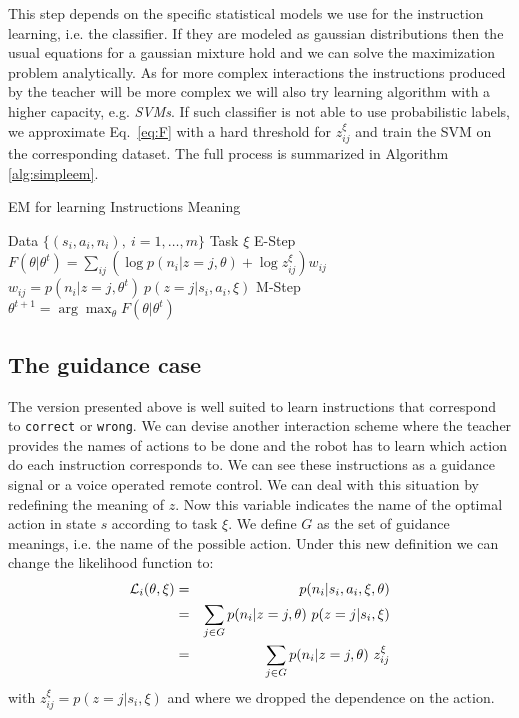 %
This step depends on the specific statistical models we use for the instruction learning, i.e. the classifier. If they are modeled as gaussian distributions then the usual equations for a gaussian mixture hold and we can solve the maximization problem analytically. As for more complex interactions the instructions produced by the teacher will be more complex we will also try learning algorithm with a higher capacity, e.g. \textit{SVMs}. If such classifier is not able to use probabilistic labels, we approximate Eq.~\ref{eq:F} with a hard threshold for $z_{ij}^{\xi}$ and train the SVM on the corresponding dataset. The full process is summarized in Algorithm \ref{alg:simpleem}.
%
\begin{algorithm}
\caption{EM for learning Instructions Meaning}
\begin{algorithmic}[1]
\REQUIRE Data $\{(s_i,a_i,n_i),\ i = 1,\ldots,m\}$
\REQUIRE Task $\xi$
\WHILE{\TRUE} 
\STATE E-Step \\ $F(\theta|\theta^t) = \sum_{ij} \left(\log{p(n_i|z=j,\theta)}+\log{z_{ij}^\xi}\right) w_{ij}$ \\
$w_{ij} = p(n_i|z=j,\theta^t)~p(z=j|s_i,a_i,\xi)$
\STATE M-Step \\ $\theta^{t+1} = \arg\max_{\theta} F(\theta|\theta^t)$
\ENDWHILE
\end{algorithmic}
\label{alg:simpleem}
\end{algorithm}

\subsection{The guidance case}

The version presented above is well suited to learn instructions that correspond to \texttt{correct} or \texttt{wrong}. We can devise another interaction scheme where the teacher provides the names of actions to be done and the robot has to learn which action do each instruction corresponds to. We can see these instructions as a guidance signal or a voice operated remote control. We can deal with this situation by redefining the meaning of $z$. Now this variable indicates the name of the optimal action in state $s$ according to task $\xi$. We define $G$ as the set of guidance meanings, i.e. the name of the possible action. Under this new definition we can change the likelihood function to:
%
\begin{eqnarray}
\L_{i}(\theta,\xi) &=&  p(n_i|s_i,a_i,\xi,\theta)\nonumber\\
				&=&	\sum_{j \in G} p(n_i|z = j,\theta)~p(z = j|s_i,\xi)	\nonumber\\
				&=&	\sum_{j \in G} p(n_i|z = j,\theta)~z_{ij}^{\xi}
				\label{eq:likact}
\end{eqnarray}
%
with $z_{ij}^{\xi} = p(z = j|s_i,\xi)$ and where we dropped the dependence on the action.

